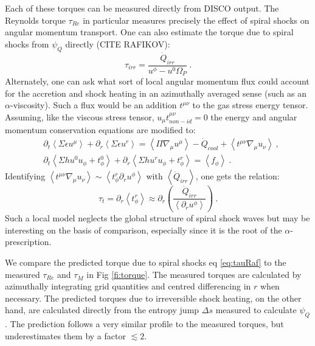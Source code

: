 \documentclass{emulateapj}
\newcommand{\al}{\alpha}
\newcommand{\De}{\Delta}
\newcommand{\eps}{\epsilon}
\newcommand{\Sig}{\Sigma}
\newcommand{\Om}{\Omega}
\newcommand{\ave}[1]{\left \langle #1 \right \rangle}
\begin{document}
Each of these torques can be measured directly from DISCO output.  The Reynolds torque $\tau_{Re}$ in particular measures precisely the effect of spiral shocks on angular momentum transport.  One can also estimate the torque due to spiral shocks from $\psi_Q$ directly (CITE RAFIKOV):
\begin{equation}
	\tau_{irr} = \frac{\dot{Q}_{irr}}{u^\phi - u^0 \Om_P} \ . \label{eq:tauRaf}
\end{equation}
Alternately, one can ask what sort of local angular momentum flux could account for the accretion and shock heating in an azimuthally averaged sense (such as an $\al$-viscosity).  Such a flux would be an addition $t^{\mu\nu}$ to the gas stress energy tensor.  Assuming, like the viscous stress tensor, $u_\mu t^{\mu\nu}_{non-id} = 0$ the energy and angular momentum conservation equations are modified to:
\begin{align}
	&\partial_t \ave{\Sig \eps u^\mu} + \partial_r \ave{\Sig \eps u^r} = \ave{\Pi \nabla_\mu u^\mu} - \dot{Q}_{cool} + \ave{t^{\mu\nu} \nabla_\mu u_\nu} \ ,\\
	&\partial_t \ave{\Sig h u^0 u_\phi + t^0_\phi} + \partial_r \ave{\Sig h u^r u_\phi + t^r_\phi} = \ave{f_\phi} \ .
\end{align}
Identifying $\ave{t^{\mu\nu} \nabla_\mu u_\nu} \sim \ave{t^r_\phi \partial_r u^\phi}$ with $\ave{\dot{Q}_{irr}}$, one gets the relation:
\begin{equation}
	\tau_{t} = \partial_r \ave{t^r_\phi} \approx \partial_r \left(\frac{\dot{Q}_{irr}}{\ave{\partial_r u^\phi}} \right)\ . \label{eq:tauLoc}
\end{equation}
Such a local model neglects the global structure of spiral shock waves but may be interesting on the basis of comparison,  especially since it is the root of the $\alpha$-prescription.

We compare the predicted torque due to spiral shocks eq \eqref{eq:tauRaf} to the measured $\tau_{Re}$ and $\tau_{\dot{M}}$ in Fig \ref{fi:torque}.  The measured torques are calculated by azimuthally integrating grid quantities and centred differencing in $r$ when necessary.  The predicted torques due to irreversible shock heating, on the other hand, are calculated directly from the entropy jump $\De s$ measured to calculate $\psi_Q$.  The prediction follows a very similar profile to the measured torques, but underestimates them by a factor $\lesssim 2$.  

\end{document}
